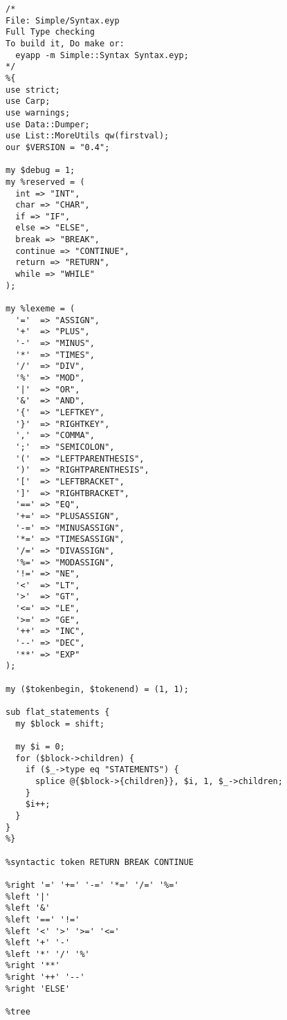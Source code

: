 \begin{verbatim}
/* 
File: Simple/Syntax.eyp
Full Type checking
To build it, Do make or:
  eyapp -m Simple::Syntax Syntax.eyp; 
*/
%{
use strict;
use Carp;
use warnings;
use Data::Dumper;
use List::MoreUtils qw(firstval);
our $VERSION = "0.4";

my $debug = 1;
my %reserved = (
  int => "INT",
  char => "CHAR",
  if => "IF",
  else => "ELSE",
  break => "BREAK",
  continue => "CONTINUE",
  return => "RETURN",
  while => "WHILE"
);

my %lexeme = (
  '='  => "ASSIGN",
  '+'  => "PLUS",
  '-'  => "MINUS",
  '*'  => "TIMES",
  '/'  => "DIV",
  '%'  => "MOD",
  '|'  => "OR",
  '&'  => "AND",
  '{'  => "LEFTKEY",
  '}'  => "RIGHTKEY",
  ','  => "COMMA",
  ';'  => "SEMICOLON",
  '('  => "LEFTPARENTHESIS",
  ')'  => "RIGHTPARENTHESIS",
  '['  => "LEFTBRACKET",
  ']'  => "RIGHTBRACKET",
  '==' => "EQ",
  '+=' => "PLUSASSIGN",
  '-=' => "MINUSASSIGN",
  '*=' => "TIMESASSIGN",
  '/=' => "DIVASSIGN",
  '%=' => "MODASSIGN",
  '!=' => "NE",
  '<'  => "LT",
  '>'  => "GT",
  '<=' => "LE",
  '>=' => "GE",
  '++' => "INC",
  '--' => "DEC",
  '**' => "EXP"
);

my ($tokenbegin, $tokenend) = (1, 1);

sub flat_statements {
  my $block = shift;

  my $i = 0;
  for ($block->children) {
    if ($_->type eq "STATEMENTS") {
      splice @{$block->{children}}, $i, 1, $_->children;
    }
    $i++;
  }
}
%}

%syntactic token RETURN BREAK CONTINUE

%right '=' '+=' '-=' '*=' '/=' '%='
%left '|'
%left '&'
%left '==' '!='
%left '<' '>' '>=' '<='
%left '+' '-'
%left '*' '/' '%'
%right '**'
%right '++' '--'
%right 'ELSE'

%tree
\end{verbatim}


